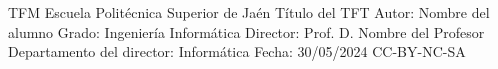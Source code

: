 \documentclass[a4paper,12pt,twoside,hidelinks,openany]{report}
\begin{document}

\thispagestyle{empty}

\tfgPortada
{TFM} %
{Escuela Politécnica Superior de Jaén} %
{Título del TFT} %
{Autor: Nombre del alumno} 
{Grado: Ingeniería Informática}
{Director: Prof. D. Nombre del Profesor} %
{Departamento del director: Informática}
{Fecha: 30/05/2024}
{CC-BY-NC-SA} %

\thispagestyle{empty}
\cleardoublepage
\newpage

\newpage
\thispagestyle{empty}

\thispagestyle{empty}
\cleardoublepage
\newpage
\thispagestyle{empty}

\thispagestyle{empty}
\cleardoublepage
\renewcommand{\contentsname}{Índice}
\tableofcontents

\setcounter{page}{1}








\nocite{*} 
\end{document}
